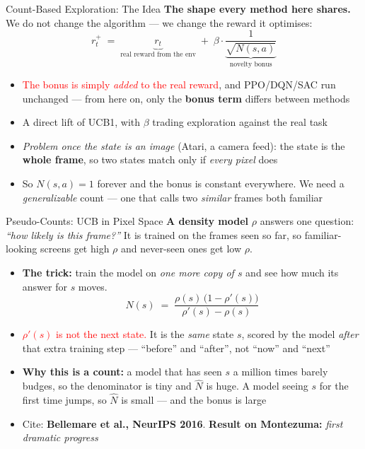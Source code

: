 \begin{frame}{Count-Based Exploration: The Idea}
\textbf{The shape every method here shares.} We do not change the algorithm --- we change the reward it optimises:
\[
    r_t^+ \;=\; \underbrace{r_t}_{\text{real reward from the env}} \;+\; \beta \cdot \underbrace{\frac{1}{\sqrt{N(s,a)}}}_{\text{novelty bonus}}
\]
\begin{itemize}
    \setlength{\itemsep}{0.4em}
    \item \textcolor{red}{The bonus is simply \emph{added} to the real reward}, and PPO/DQN/SAC run unchanged --- from here on, only the \textbf{bonus term} differs between methods
    \item A direct lift of UCB1, with $\beta$ trading exploration against the real task
    \item \emph{Problem once the state is an image} (Atari, a camera feed): the state is the \textbf{whole frame}, so two states match only if \emph{every pixel} does
    \item So $N(s,a) = 1$ forever and the bonus is constant everywhere. We need a \emph{generalizable} count --- one that calls two \emph{similar} frames both familiar
\end{itemize}
\end{frame}

\begin{frame}{Pseudo-Counts: UCB in Pixel Space}
\textbf{A density model} $\rho$ answers one question: \emph{``how likely is this frame?''} It is trained on the frames seen so far, so familiar-looking screens get high $\rho$ and never-seen ones get low $\rho$.
\vspace{0.3em}
\begin{itemize}
    \setlength{\itemsep}{0.45em}
    \item \textbf{The trick:} train the model on \emph{one more copy of $s$} and see how much its answer for $s$ moves.
    \[
        \hat{N}(s) \;=\; \frac{\rho(s)\,\big(1 - \rho'(s)\big)}{\rho'(s) - \rho(s)}
    \]
    \item \textcolor{red}{$\rho'(s)$ is not the next state.} It is the \emph{same} state $s$, scored by the model \emph{after} that extra training step --- ``before'' and ``after'', not ``now'' and ``next''
    \item \textbf{Why this is a count:} a model that has seen $s$ a million times barely budges, so the denominator is tiny and $\hat{N}$ is huge. A model seeing $s$ for the first time jumps, so $\hat{N}$ is small --- and the bonus is large
    \item Cite: \textbf{Bellemare et al., NeurIPS 2016}. \textbf{Result on Montezuma:} \emph{first dramatic progress}
\end{itemize}
\end{frame}

